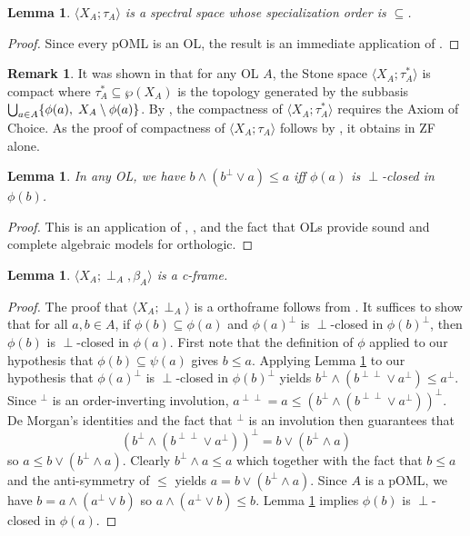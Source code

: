 \documentclass{amsart}
\theoremstyle{plain}
\newtheorem{lemma}[theorem]{Lemma}
\theoremstyle{definition}
\newtheorem{remark}[theorem]{Remark}
\begin{document}
\begin{lemma}\label{spectral space}
     $\langle X_A;\tau_A\rangle$ is a spectral space whose specialization order is $\subseteq$.  
\end{lemma}
\begin{proof}
Since every pOML is an OL, the result is an immediate application of \cite[Proposition 3.4.1]{mcdonald}.  
\end{proof}
\begin{remark}
    It was shown in \cite[Proposition 3]{goldblatt1} that for any OL $A$, the Stone space $\langle X_A;\tau_A^*\rangle$ is compact where $\tau_A^*\subseteq\wp(X_A)$ is the topology generated by the subbasis $\bigcup_{a\in A}\{\phi(a),\hspace{.1cm}X_A\setminus\phi(a)\}$. By \cite[Proposition 3.3.1]{mcdonald}, the compactness of $\langle X_A;\tau_A^*\rangle$ requires the Axiom of Choice. As the proof of compactness of $\langle X_A;\tau_A\rangle$ follows by \cite[Proposition 3.4.1]{mcdonald}, it obtains in ZF alone.     
\end{remark}
\begin{lemma}\label{lemma 2.8}
    In any OL, we have $b\wedge(b^{\perp}\vee a)\leq a$ iff $\phi(a)$ is $\perp$-closed in $\phi(b)$. 
\end{lemma}
\begin{proof}
    This is an application of \cite[Lemma 6.3]{goldblatt2}, \cite[Theorem 3.7]{goldblatt2}, and the fact that OLs provide sound and complete algebraic models for orthologic.      
\end{proof}
\begin{lemma}\label{poml to c-frame}
    $\langle X_A;\perp_A,\beta_A\rangle$ is a c-frame. 
\end{lemma}
\begin{proof}
    The proof that $\langle X_A;\perp_A\rangle$ is a orthoframe follows from \cite[Proposition 2]{goldblatt1}. It suffices to show that for all $a,b
    \in A$, if $\phi(b)\subseteq\phi(a)$ and $\phi(a)^{\perp}$ is $\perp$-closed in $\phi(b)^{\perp}$, then $\phi(b)$ is $\perp$-closed in $\phi(a)$. First note that the definition of $\phi$ applied to our hypothesis that $\phi(b)\subseteq\psi(a)$ gives $b\leq a$. Applying Lemma \ref{lemma 2.8} to our hypothesis that $\phi(a)^{\perp}$ is $\perp$-closed in $\phi(b)^{\perp}$ yields $b^{\perp}\wedge(b^{\perp\perp}\vee a^{\perp})\leq a^{\perp}$. Since $^{\perp}$ is an order-inverting involution, $a^{\perp\perp}=a\leq(b^{\perp}\wedge(b^{\perp\perp}\vee a^{\perp}))^{\perp}$. De Morgan's identities and the fact that $^{\perp}$ is an involution then guarantees that  \[(b^{\perp}\wedge(b^{\perp\perp}\vee a^{\perp}))^{\perp}=b\vee(b^{\perp}\wedge a)\] so $a\leq b\vee(b^{\perp}\wedge a)$. Clearly $b^{\perp}\wedge a\leq a$ which together with the fact that $b\leq a$ and the anti-symmetry of $\leq$ yields $a=b\vee(b^{\perp}\wedge a)$. Since $A$ is a pOML, we have $b=a\wedge(a^{\perp}\vee b)$ so $a\wedge(a^{\perp}\vee b)\leq b$. Lemma \ref{lemma 2.8} implies $\phi(b)$ is $\perp$-closed in $\phi(a)$.  
\end{proof}
\end{document}
